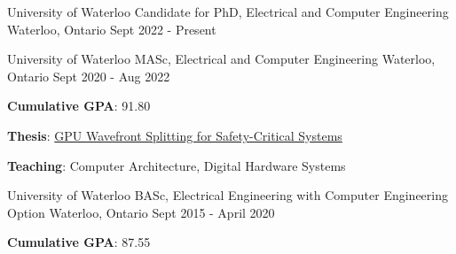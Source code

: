 

\begin{cventries}

  \cventry
    {University of Waterloo} %
    {Candidate for PhD, Electrical and Computer Engineering} %
    {Waterloo, Ontario} %
    {Sept 2022 - Present} %
    {}
 \vspace{-1em}
    
  \cventry
    {University of Waterloo} %
    {MASc, Electrical and Computer Engineering} %
    {Waterloo, Ontario} %
    {Sept 2020 - Aug 2022} %
    {
      \begin{cvitems} %
        \item \textbf{Cumulative GPA}: 91.80
        \item \textbf{Thesis}: \href{https://uwspace.uwaterloo.ca/handle/10012/18872}{GPU Wavefront Splitting for Safety-Critical Systems}
        \item \textbf{Teaching}: Computer Architecture, Digital Hardware Systems
      \end{cvitems}
    }
  
  \cventry
    {University of Waterloo} %
    {BASc, Electrical Engineering with Computer Engineering Option} %
    {Waterloo, Ontario} %
    {Sept 2015 - April 2020} %
    {
      \begin{cvitems} %
        \item \textbf{Cumulative GPA}: 87.55
      \end{cvitems}
    }

\end{cventries}
